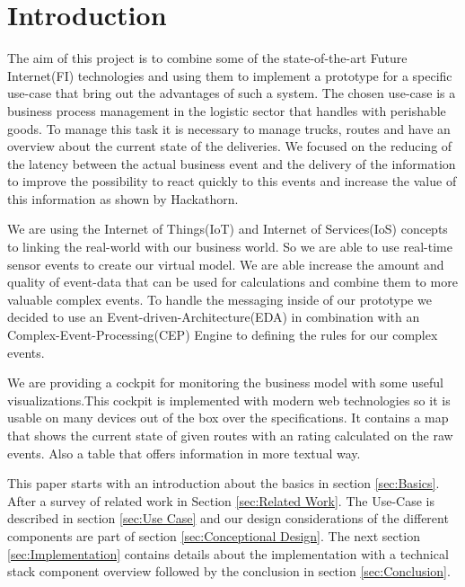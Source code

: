 \documentclass{acm_proc_article-sp}
\begin{document}
\section{Introduction}
The aim of this project is to combine some of the state-of-the-art Future Internet(FI) technologies and using them to implement a prototype for a specific use-case that bring out the advantages of such a system.
The chosen use-case is a business process management in the logistic sector that handles with perishable goods. To manage this task it is necessary to manage trucks, routes and have an overview about the current state of the deliveries. We focused on the reducing of the latency between the actual business event and the delivery of the information to improve the possibility to react quickly to this events and increase the value of this information as shown by Hackathorn\cite{hackathron:real_time_to_real_value}.

We are using the Internet of Things(IoT) and Internet of Services(IoS) concepts to linking the real-world with our business world. So we are able to use real-time sensor events to create our virtual model. We are able increase the amount and quality of event-data that can be used for calculations and combine them to more valuable complex events.
To handle the messaging inside of our prototype we decided to use an Event-driven-Architecture(EDA) in combination with an Complex-Event-Processing(CEP) Engine to defining the rules for our complex events.

We are providing a cockpit for monitoring the business model with some useful visualizations.This cockpit is implemented with modern web technologies so it is usable on many devices out of the box over the specifications. It contains a map that shows the current state of given routes with an rating calculated on the raw events. Also a table that offers information in more textual way.

This paper starts with an introduction about the basics in section \ref{sec:Basics}.
After a survey of related work in Section \ref{sec:Related Work}. 
The Use-Case is described in section \ref{sec:Use Case} and our design considerations of the different components are part of section \ref{sec:Conceptional Design}.
The next section \ref{sec:Implementation} contains details about the implementation with a technical stack component overview followed by the conclusion in section \ref{sec:Conclusion}.
\end{document}
